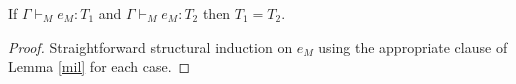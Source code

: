 \begin{muot}
\label{muot}
If $\Gamma\vdash_{M}e_{M}:T_{1}$ and $\Gamma\vdash_{M}e_{M}:T_{2}$ then $T_{1}=T_{2}$.
\begin{proof}
Straightforward structural induction on $e_{M}$ using the appropriate clause of Lemma \ref{mil} for each case.
\end{proof}
\end{muot}